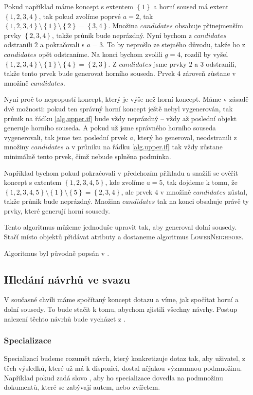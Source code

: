 \documentclass[12pt]{article}
\newcommand{\ssection}[1]{\subsection{#1}}
\newcommand{\sssection}[1]{\subsubsection{#1}}
\newcommand{\adds}[1]{\left\{#1\right\}}
\begin{document}
Pokud například máme koncept s extentem $\adds{1}$ a horní soused má extent $\adds{1,2,3,4}$, tak pokud zvolíme poprvé $a=2$, tak $\adds{1,2,3,4} \setminus \adds{1} \setminus \adds{2} = \adds{3, 4}$. Množina $candidates$ obsahuje přinejmenším prvky $\adds{2, 3, 4}$, takže průnik bude neprázdný. Nyní bychom z $candidates$ odstranili $2$ a pokračovali s $a=3$. To by neprošlo ze stejného důvodu, takže ho z $candidates$ opět odstraníme. Na konci bychom zvolili $g=4$, rozdíl by vyšel $\adds{1,2,3,4} \setminus \adds{1} \setminus \adds{4} = \adds{2, 3}$. Z $candidates$ jsme prvky $2$ a $3$ odstranili, takže tento prvek bude generovat horního souseda. Prvek $4$ zároveň zůstane v množině $candidates$.

Nyní proč to nepropustí koncept, který je výše než horní koncept. Máme v zásadě dvě možnosti: pokud ten správný horní koncept ještě nebyl vygenerován, tak průnik na řádku \ref{alg.upper.if} bude vždy neprázdný -- vždy až poslední objekt generuje horního souseda. A pokud už jsme správného horního souseda vygenerovali, tak jsme ten poslední prvek $a$, který ho generoval, neodstranili z množiny $candidates$ a v průniku na řádku \ref{alg.upper.if} tak vždy zůstane minimálně tento prvek, čímž nebude splněna podmínka. 

Například bychom pokud pokračovali v předchozím příkladu a snažili se ověřit koncept s extentem $\adds{1,2,3,4,5}$, kde zvolíme $a=5$, tak dojdeme k tomu, že $\adds{1,2,3,4,5} \setminus \adds{1} \setminus \adds{5} = \adds{2,3,4}$, ale prvek $4$ v množině $candidates$ zůstal, takže průnik bude neprázdný. Množina $candidates$ tak na konci obsahuje právě ty prvky, které generují horní sousedy. 

Tento algoritmus můžeme jednoduše upravit tak, aby generoval dolní sousedy. Stačí místo objektů přidávat atributy a dostaneme algoritmus \textsc{LowerNeighbors}.

Algoritmus byl původně popsán v \cite{lindig}.

\ssection{Hledání návrhů ve svazu}

V současné chvíli máme spočítaný koncept dotazu a víme, jak spočítat horní a dolní sousedy. To bude stačit k tomu, abychom zjistili všechny návrhy. Postup nalezení těchto návrhů bude vycházet z \cite{searchsleuth}.

\sssection{Specializace}
Specializací budeme rozumět návrh, který konkretizuje dotaz tak, aby uživatel, z těch výsledků, které už má k dispozici, dostal nějakou významnou podmnožinu. Například pokud zadá slovo , aby ho specializace dovedla na podmnožinu dokumentů, které se zabývají autem, nebo zvířetem. 
\end{document}
